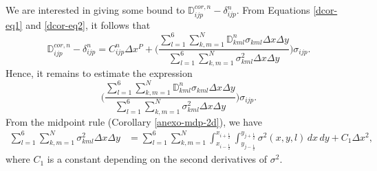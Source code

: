We are interested in giving some bound to
$\mathbb{D}^{cor,n}_{ijp} - \mathbb{\delta}^n_{ijp}$.
From Equations \eqref{dcor-eq1} and \eqref{dcor-eq2}, it follows that
\begin{equation}
	\label{dcor-eq4}
	\mathbb{D}^{cor,n}_{ijp} - \mathbb{\delta}^n_{ijp} =
	C_{ijp}^n\Delta x^P+  
\bigg( \frac{\sum_{l=1}^6 \sum_{k,m=1}^N \mathbb{D}_{kml}^n \sigma_{kml} \Delta x \Delta y}
{\sum_{l=1}^6 \sum_{k,m=1}^N \sigma_{kml}^2 \Delta x \Delta y}\bigg)\sigma_{ijp}. 
\end{equation}
Hence, it remains to estimate the expression
\begin{equation}
	\label{dcor-eq5}
	\bigg( \frac{\sum_{l=1}^6 \sum_{k,m=1}^N \mathbb{D}_{kml}^n \sigma_{kml} \Delta x \Delta y}
	{\sum_{l=1}^6 \sum_{k,m=1}^N \sigma_{kml}^2 \Delta x \Delta y}\bigg)\sigma_{ijp}.
\end{equation}
From the midpoint rule (Corollary \ref{anexo-mdp-2d}), we have
\begin{align}
	\sum_{l=1}^6 \sum_{k,m=1}^N	\mathbb \sigma_{kml}^2 {\Delta x \Delta y}  &= 
	\sum_{l=1}^6 \sum_{k,m=1}^N
	\int_{x_{i-{\frac{1}{2}}}}^{x_{i+{\frac{1}{2}}}}
	\int_{y_{j-{\frac{1}{2}}}}^{y_{j+{\frac{1}{2}}}}
	\sigma^2(x,y,l) \,dx \,dy
	+C_1\Delta x^2,
\label{dcor-eq6}
\end{align}
where $C_1$ is a constant depending on the second derivatives of $\sigma^2$.

